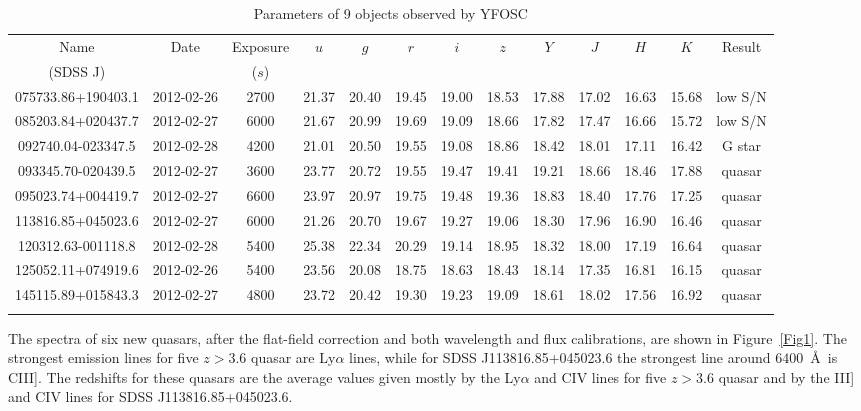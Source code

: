 \documentclass[referee]{raa}
\begin{document}
\begin{table}
\bc
\begin{minipage}[]{100mm}
\caption[]{Parameters of 9 objects observed by YFOSC\label{tab1}}\end{minipage}
\setlength{\tabcolsep}{1pt}
\small
 \begin{tabular}{ccccccccccccc}
  \hline\noalign{\smallskip}
Name& Date& Exposure&$u$& $g$& $r$& $i$& $z$& $Y$& $J$& $H$& $K$& Result\\
(SDSS J)& &($s$)&&&&&&&&&&\\
  \hline\noalign{\smallskip}
075733.86+190403.1&2012-02-26&2700&21.37&20.40&19.45&19.00&18.53&17.88&17.02&16.63&15.68&low S/N\\
085203.84+020437.7&2012-02-27&6000&21.67&20.99&19.69&19.09&18.66&17.82&17.47&16.66&15.72&low S/N\\
092740.04-023347.5&2012-02-28&4200&21.01& 20.50&19.55&19.08&18.86&18.42&18.01&17.11&16.42&G star\\
093345.70-020439.5&2012-02-27&3600&23.77&20.72&19.55&19.47&19.41&19.21&18.66&18.46&17.88&quasar \\
095023.74+004419.7&2012-02-27&6600&23.97&20.97&19.75&19.48&19.36&18.83&18.40&17.76&17.25&quasar\\
113816.85+045023.6&2012-02-27&6000&21.26&20.70&19.67&19.27&19.06&18.30&17.96&16.90&16.46&quasar\\
120312.63-001118.8&2012-02-28&5400&25.38&22.34&20.29&19.14&18.95&18.32&18.00&17.19&16.64&quasar\\
125052.11+074919.6&2012-02-26&5400&23.56&20.08&18.75&18.63&18.43&18.14&17.35&16.81&16.15&quasar \\
145115.89+015843.3&2012-02-27&4800&23.72&20.42&19.30&19.23&19.09&18.61&18.02&17.56&16.92&quasar \\
  \noalign{\smallskip}\hline
\end{tabular}
\ec
\end{table}

The spectra of six new quasars, after the flat-field correction and both wavelength and flux calibrations, are shown in Figure~\ref{Fig1}. The strongest emission lines for five $z>3.6$ quasar are Ly$\alpha$ lines, while for SDSS J113816.85+045023.6 the strongest line around $6400$~\AA\ is CIII]. The redshifts for these quasars are the average values given mostly by the Ly$\alpha$
and CIV lines for five $z>3.6$ quasar and by the  III] and CIV lines for SDSS J113816.85+045023.6.
\end{document}
